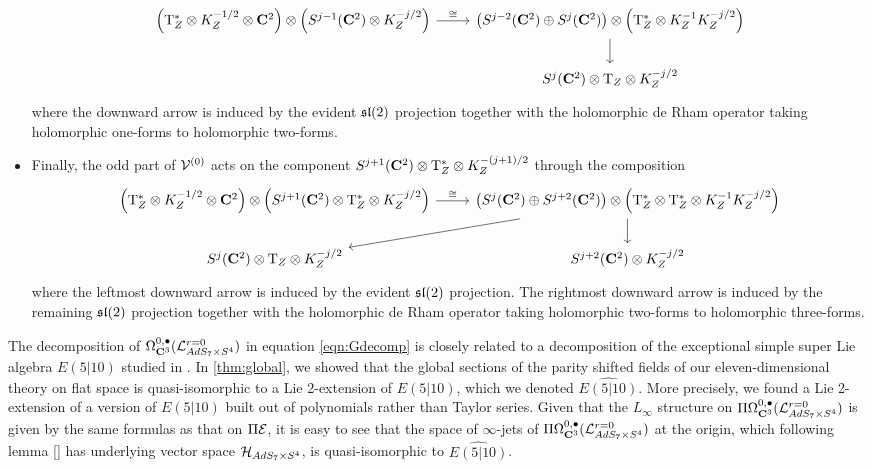 \documentclass[../main.tex]{subfiles}
\begin{document}
\begin{itemize}
\begin{equation}
\begin{tikzcd}
\left(\T^*_Z \otimes K^{-1/2}_Z \otimes \C^2\right) \otimes \left(S^{j-1}(\C^2) \otimes K^{-j/2}_Z\right) \ar[r,"\cong"] & \left(S^{j-2}(\C^2) \oplus S^{j}(\C^2)\right) \otimes \left(\T^*_Z \otimes K^{-1}_Z K^{-j/2}_Z\right) \ar[d] \\
& S^{j}(\C^2) \otimes \T_Z \otimes K^{-j/2}_Z
\end{tikzcd}
\end{equation}
where the downward arrow is induced by the evident $\mathfrak{sl}(2)$ projection together with the holomorphic de Rham operator taking holomorphic one-forms to holomorphic two-forms. 
\item Finally, the odd part of $\mathcal{V}^{(0)}$ acts on the component $S^{j+1}(\mathbf{C}^2) \otimes {\mathrm{T}}^*_Z \otimes K^{-(j+1)/2}_Z$ through the composition
\begin{equation}
\begin{tikzcd}
\left(\T^*_Z \otimes K^{-1/2}_Z \otimes \C^2\right) \otimes \left(S^{j+1}(\C^2) \otimes \T^*_Z \otimes K^{-j/2}_Z\right) \ar[r,"\cong"] & \left(S^{j}(\C^2) \oplus S^{j+2}(\C^2)\right) \otimes \left(\T^*_Z \otimes \T^*_Z \otimes K^{-1}_Z K^{-j/2}_Z\right) \ar[dl] \ar[d] \\
S^j (\C^2) \otimes \T_Z \otimes K_Z^{-j/2} & S^{j+2}(\C^2)  \otimes K^{-j/2}_Z
\end{tikzcd}
\end{equation}
where the leftmost downward arrow is induced by the evident $\mathfrak{sl}(2)$ projection.
The rightmost downward arrow is induced by the remaining $\mathfrak{sl}(2)$ projection together with the holomorphic de Rham operator taking holomorphic two-forms to holomorphic three-forms.
\end{itemize}
\fi

\parsec[s:kacrelation]

The decomposition of $\Omega^{0,\bullet}_{\mathbf{C}^3} (\mathcal{L}^{r=0}_{AdS_7\times S^4} )$ in equation \eqref{eqn:Gdecomp} is closely related to a decomposition of the exceptional simple super Lie algebra $E(5|10)$ studied in \cite{KR2}. In \ref{thm:global}, we showed that the global sections of the parity shifted fields of our eleven-dimensional theory on flat space is quasi-isomorphic to a Lie 2-extension of $E(5|10)$, which we denoted $\widehat{E(5|10)}$. More precisely, we found a Lie 2-extension of a version of $E(5|10)$ built out of polynomials rather than Taylor series. Given that the $L_\infty$ structure on $\Pi \Omega^{0,\bullet}_{\mathbf{C}^3} (\mathcal{L}^{r=0}_{AdS_7\times S^4} )$ is given by the same formulas as that on $\Pi \mathcal{E}$, it is easy to see that the space of $\infty$-jets of $\Pi \Omega^{0,\bullet}_{\mathbf{C}^3} (\mathcal{L}^{r=0}_{AdS_7\times S^4} )$ at the origin, which following lemma \ref{} has underlying vector space $\mathcal{H}_{AdS_7\times S^4}$, is quasi-isomorphic to $\widehat{E(5|10)}$. 
\end{document}
